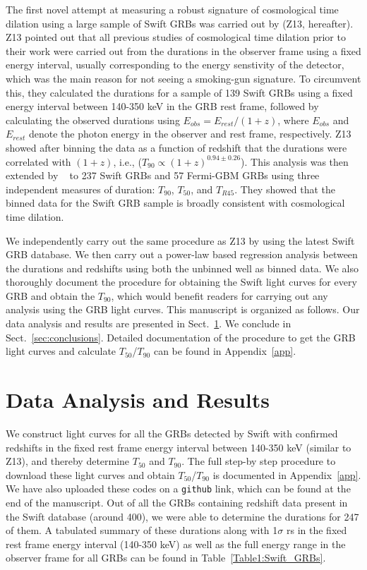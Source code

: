 \documentclass[prd,nofootinbib,preprintnumbers,floatfix]{revtex4}  %
\begin{document}
The first novel attempt at  measuring  a robust signature of cosmological time dilation using a large sample of Swift GRBs was carried out by \citet{zhang2013cosmological} (Z13, hereafter). Z13 pointed out that all previous studies of cosmological time dilation prior to their work were carried out from the durations in the observer frame using a fixed energy interval, usually corresponding to the energy senstivity of the detector, which was the main reason for not seeing  a smoking-gun  signature.
To circumvent this, they calculated the durations for a sample of 139 Swift GRBs using a fixed energy interval between 140-350 keV in the GRB rest frame, followed by calculating the observed durations using $E_{obs}= E_{rest}/(1+z)$, where $E_{obs}$ and $E_{rest}$ denote the photon energy in the observer and rest frame, respectively. Z13 showed after binning the data as a function of redshift that  the durations were correlated with $(1+z)$, i.e., ($T_{90} \propto (1+z)^{0.94 \pm 0.26}$). This analysis was then extended by ~\cite{Butler} to 237 Swift GRBs and 57 Fermi-GBM GRBs using three independent measures of duration: $T_{90}$, $T_{50}$, and $T_{R45}$. They showed that the binned data for the  Swift GRB sample is broadly consistent with cosmological time dilation.

We independently carry out the same procedure as Z13 by  using the latest Swift GRB database. We then carry out a power-law  based regression analysis between the durations and redshifts  using both the unbinned well as binned data. We also thoroughly document the procedure for obtaining the Swift light curves for every GRB and obtain the $T_{90}$, which would benefit readers for carrying out any analysis using the GRB light curves. 
This manuscript is organized as follows.  Our data  analysis and results are presented in Sect.~\ref{sec:results}. We conclude in Sect.~\ref{sec:conclusions}. Detailed documentation of the procedure to get the GRB light curves and calculate $T_{50}$/$T_{90}$ can be found in Appendix~\ref{app}.

\section{Data  Analysis and Results}

\label{sec:results}
We construct light curves for all the GRBs detected by Swift with confirmed redshifts in the fixed  rest frame energy interval between 140-350 keV (similar to Z13), and thereby determine $T_{50}$ and $T_{90}$. The full step-by step procedure to download these light curves and obtain $T_{50}$/$T_{90}$ is documented in Appendix~\ref{app}. We have also uploaded these codes on a {\tt github} link, which can be found at the end of the manuscript. Out of all the GRBs containing redshift data present in the Swift database (around 400), we were able to determine the durations for 247 of them.  A tabulated summary of these durations along with 1$\sigma$ rs in the fixed rest frame energy interval (140-350 keV) as well as the full energy range in the observer frame for all GRBs can be found in Table~\ref{Table1:Swift_GRBs}.
\end{document}
